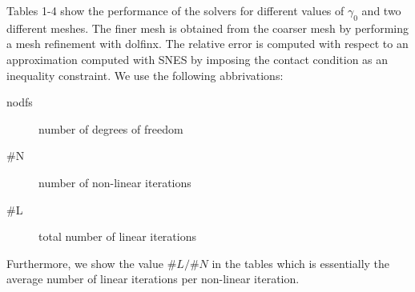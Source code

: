 \documentclass[12pt]{article}
\begin{document}
Tables 1-4 show the performance of the solvers for different values of $\gamma_0$ and two different meshes. The finer
mesh is obtained from the coarser mesh by performing a mesh refinement with dolfinx. The relative error is computed with respect 
to an approximation computed with SNES by imposing the contact condition as an inequality constraint. We use the following abbrivations:
\begin{description}
\item[nodfs] number of degrees of freedom 
\item[\#N] number of non-linear iterations
\item[\#L] total number of linear iterations
\end{description}
Furthermore, we show the value $\#L/\#N$ in the tables which is essentially the average number of linear iterations per non-linear iteration.
\end{document}
